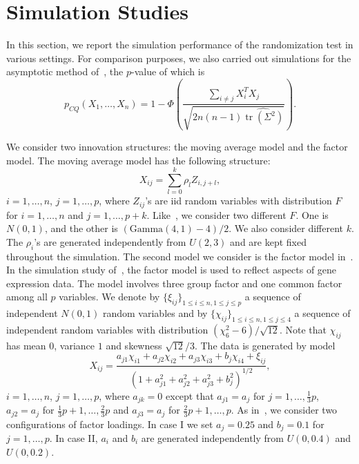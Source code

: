 \documentclass[review]{elsarticle}
\DeclareMathOperator{\mytr}{tr}
\theoremstyle{plain}
\theoremstyle{definition}
\theoremstyle{remark}
\begin{document}
\section{Simulation Studies}

In this section, we report the simulation performance of the randomization test in various settings.
For comparison purposes, we also carried out simulations for the asymptotic method of~\citet{Chen2010A},
the $p$-value of which is
\begin{equation*}
p_{CQ}(X_1,\ldots,X_n)=1-\Phi\left(\frac{\sum_{i\neq j}X_i^T X_j}{\sqrt{2n(n-1)\widehat{\mytr(\Sigma^2)}}}\right).
\end{equation*}

We consider two innovation structures: the moving average model and the factor model.
The moving average model has the following structure:
    \begin{equation*}
    X_{ij}=\sum_{l=0}^k \rho_{l}Z_{i,j+l},
    \end{equation*}
$i=1,\ldots, n$, $j=1,\ldots, p$, where $Z_{ij}$'s are iid random variables with distribution $F$ for $i=1,\ldots, n$ and $j=1,\ldots, p+k$. 
Like~\citet{Chen2010A}, we consider two different $F$.
One is $N(0,1)$, and the other is $(\textrm{Gamma}(4,1)-4)/2$.
We also consider different $k$.
The $\rho_i$'s are generated independently from $U(2,3)$ and are kept fixed throughout the simulation.
The second model we consider is the factor model in~\citet{fan2007to}.
In the simulation study of~\citet{fan2007to}, the factor model is used to reflect aspects of gene expression data.
The model involves three group factor and one common factor among all $p$ variables. 
We denote by $\{\xi_{ij}\}_{1\leq i\leq n, 1\leq j\leq p}$ a sequence of independent $N(0,1)$ random variables and by $\{\chi_{ij}\}_{1\leq i \leq n, 1\leq j \leq 4}$ a sequence of independent random variables with distribution $(\chi_{6}^2-6)/\sqrt{12}$.
Note that $\chi_{ij}$ has mean $0$, variance $1$ and skewness $\sqrt{12}/3$.
The data is generated by model
\begin{equation*}
    X_{ij}=\frac{a_{j1}\chi_{i1}+a_{j2}\chi_{i2}+a_{j3}\chi_{i3}+b_{j}\chi_{i4}+\xi_{ij}}{{(1+a_{j1}^2+a_{j2}^2+a_{j3}^2+b_j^2)}^{1/2}},
\end{equation*}
$i=1,\ldots, n$, $j=1,\ldots, p$,
where $a_{jk}=0$ except that $a_{j1}=a_j$ for $j=1,\ldots,\frac{1}{3}p$, $a_{j2}=a_j$ for $\frac{1}{3}p+1,\ldots,\frac{2}{3}p$ and $a_{j3}=a_j$ for $\frac{2}{3}p+1,\ldots,p$.
As in~\citet{fan2007to}, we consider two configurations of factor loadings. In  case I we set $a_j=0.25$ and $b_j=0.1$ for $j=1,\ldots, p$. In case II, $a_i$ and $b_i$ are generated independently from $U(0,0.4)$ and $U(0,0.2)$.
\end{document}
